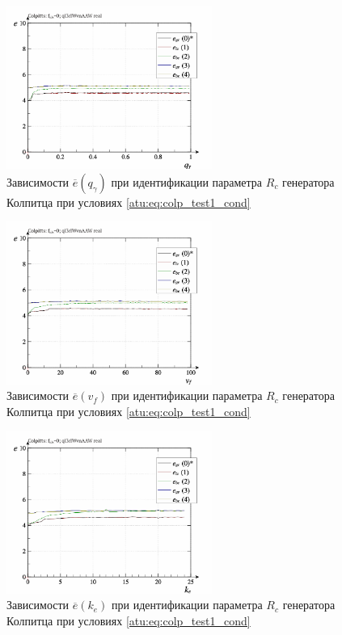\begin{figure}[htb!]
  \centerline{\includegraphics[width=0.6\textwidth]{p/r/colp_real_id-p_q_gamma_d_0.png} }
  \caption{Зависимости $\overline{e}(q_\gamma)$ при идентификации параметра $R_c$ генератора Колпитца при условиях \ref{atu:eq:colp_test1_cond} }
  \label{atu:f:colp_real_id_p_q_gamma_d_0}
\end{figure}

\begin{figure}[htb!]
  \centerline{\includegraphics[width=0.6\textwidth]{p/r/colp_real_id-p_v_f_d_0.png} }
  \caption{Зависимости $\overline{e}(v_f)$ при идентификации параметра $R_c$ генератора Колпитца при условиях \ref{atu:eq:colp_test1_cond} }
  \label{atu:f:colp_real_id_p_v_f_d_0.png}
\end{figure}


\begin{figure}[htb!]
  \centerline{\includegraphics[width=0.6\textwidth]{p/r/colp_real_id-p_k_e_d_0.png} }
  \caption{Зависимости $\overline{e}(k_e)$ при идентификации параметра $R_c$ генератора Колпитца при условиях \ref{atu:eq:colp_test1_cond} }
  \label{atu:f:colp_real_id_p_k_e_d_0.png}
\end{figure}


